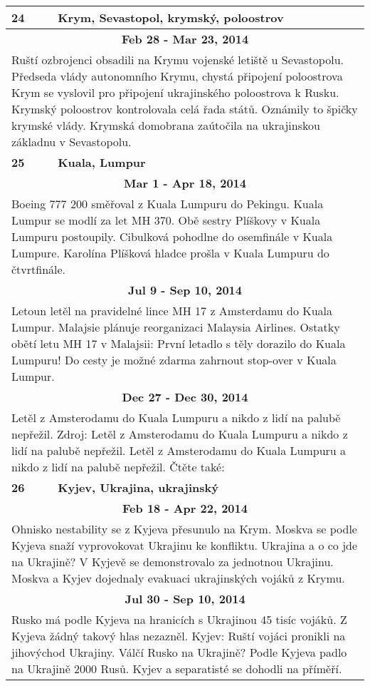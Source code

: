 \begin{tabularx}{\linewidth}{l l}
\bf 24 & \bf Krym, Sevastopol, krymský, poloostrov \\ \midrule
\multicolumn{2}{c}{\bf Feb 28 - Mar 23, 2014} \\
\multicolumn{2}{p{\linewidth}}{Ruští ozbrojenci obsadili na Krymu vojenské letiště u Sevastopolu. Předseda vlády autonomního Krymu, chystá připojení poloostrova Krym se vyslovil pro připojení ukrajinského poloostrova k Rusku. Krymský poloostrov kontrolovala celá řada států. Oznámily to špičky krymské vlády. Krymská domobrana zaútočila na ukrajinskou základnu v Sevastopolu.} \\ \midrule[1.5pt]

\bf 25 & \bf Kuala, Lumpur \\ \midrule
\multicolumn{2}{c}{\bf Mar 1 - Apr 18, 2014} \\
\multicolumn{2}{p{\linewidth}}{Boeing 777 200 směřoval z Kuala Lumpuru do Pekingu. Kuala Lumpur se modlí za let MH 370. Obě sestry Plíškovy v Kuala Lumpuru postoupily. Cibulková pohodlne do osemfinále v Kuala Lumpure. Karolína Plíšková hladce prošla v Kuala Lumpuru do čtvrtfinále.} \\ \midrule
\multicolumn{2}{c}{\bf Jul 9 - Sep 10, 2014} \\
\multicolumn{2}{p{\linewidth}}{Letoun letěl na pravidelné lince MH 17 z Amsterdamu do Kuala Lumpur. Malajsie plánuje reorganizaci Malaysia Airlines. Ostatky obětí letu MH 17 v Malajsii: První letadlo s těly dorazilo do Kuala Lumpuru! Do cesty je možné zdarma zahrnout stop-over v Kuala Lumpur.} \\ \midrule
\multicolumn{2}{c}{\bf Dec 27 - Dec 30, 2014} \\
\multicolumn{2}{p{\linewidth}}{Letěl z Amsterodamu do Kuala Lumpuru a nikdo z lidí na palubě nepřežil. Zdroj: Letěl z Amsterodamu do Kuala Lumpuru a nikdo z lidí na palubě nepřežil. Letěl z Amsterodamu do Kuala Lumpuru a nikdo z lidí na palubě nepřežil. Čtěte také:} \\ \midrule[1.5pt]

\bf 26 & \bf Kyjev, Ukrajina, ukrajinský \\ \midrule
\multicolumn{2}{c}{\bf Feb 18 - Apr 22, 2014} \\
\multicolumn{2}{p{\linewidth}}{Ohnisko nestability se z Kyjeva přesunulo na Krym. Moskva se podle Kyjeva snaží vyprovokovat Ukrajinu ke konfliktu. Ukrajina a o co jde na Ukrajině? V Kyjevě se demonstrovalo za jednotnou Ukrajinu. Moskva a Kyjev dojednaly evakuaci ukrajinských vojáků z Krymu.} \\ \midrule
\multicolumn{2}{c}{\bf Jul 30 - Sep 10, 2014} \\
\multicolumn{2}{p{\linewidth}}{Rusko má podle Kyjeva na hranicích s Ukrajinou 45 tisíc vojáků. Z Kyjeva žádný takový hlas nezazněl. Kyjev: Ruští vojáci pronikli na jihovýchod Ukrajiny. Válčí Rusko na Ukrajině? Podle Kyjeva padlo na Ukrajině 2000 Rusů. Kyjev a separatisté se dohodli na příměří.} \\ \midrule[1.5pt]


\end{tabularx}
